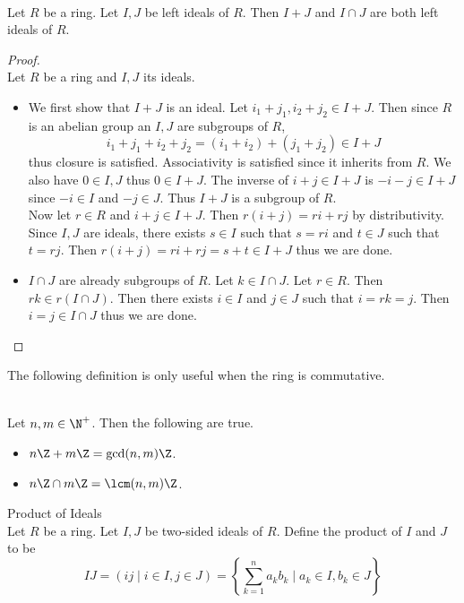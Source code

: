 \documentclass[a4paper]{article}
\begin{document}
\begin{prp}{}{}\\
Let $R$ be a ring. Let $I,J$ be left ideals of $R$. Then $I+J$ and $I\cap J$ are both left ideals of $R$. 
\begin{proof}\\
Let $R$ be a ring and $I,J$ its ideals. 
\begin{itemize}
\item We first show that $I+J$ is an ideal. Let $i_1+j_1,i_2+j_2\in I+J$. Then since $R$ is an abelian group an $I,J$ are subgroups of $R$, $$i_1+j_1+i_2+j_2=(i_1+i_2)+(j_1+j_2)\in I+J$$ thus closure is satisfied. Associativity is satisfied since it inherits from $R$. We also have $0\in I,J$ thus $0\in I+J$. The inverse of $i+j\in I+J$ is $-i-j\in I+J$ since $-i\in I$ and $-j\in J$. Thus $I+J$ is a subgroup of $R$. \\
Now let $r\in R$ and $i+j\in I+J$. Then $r(i+j)=ri+rj$ by distributivity. Since $I,J$ are ideals, there exists $s\in I$ such that $s=ri$ and $t\in J$ such that $t=rj$. Then $r(i+j)=ri+rj=s+t\in I+J$ thus we are done. 
\item $I\cap J$ are already subgroups of $R$. Let $k\in I\cap J$. Let $r\in R$. Then $rk\in r(I\cap J)$. Then there exists $i\in I$ and $j\in J$ such that $i=rk=j$. Then $i=j\in I\cap J$ thus we are done. 
\end{itemize}
\end{proof}
\end{prp}

The following definition is only useful when the ring is commutative. 

\begin{eg}{}{}\\
Let $n,m\in\N^+$. Then the following are true. 
\begin{itemize}
\item $n\Z+m\Z=\gcd(n,m)\Z$. 
\item $n\Z\cap m\Z=\lcm(n,m)\Z$. 
\end{itemize}
\end{eg}

\begin{defn}{Product of Ideals}{}\\
Let $R$ be a ring. Let $I,J$ be two-sided ideals of $R$. Define the product of $I$ and $J$ to be $$IJ=(ij\;|\;i\in I, j\in J)=\left\{\sum_{k=1}^na_kb_k\;|\;a_k\in I,b_k\in J\right\}$$
\end{defn}
\end{document}
